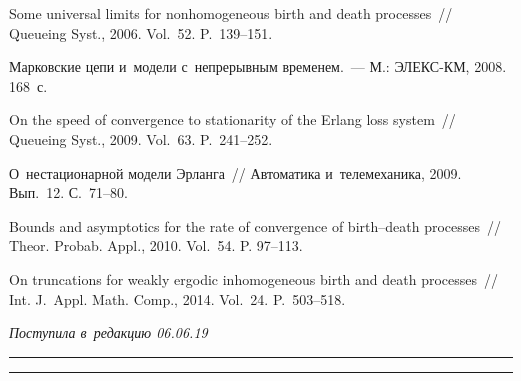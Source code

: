 \begin{multicols}{2}
{{\begin{thebibliography}{99}
Some universal limits for nonhomogeneous birth and death
processes~// Queueing Syst., 2006. Vol.~52. P.~139--151.

Марковские цепи и~модели с~непрерывным временем.~--- М.:  ЭЛЕКС-КМ, 2008. 168~с.

 On the speed of convergence to stationarity
of the Erlang loss system~// Queueing Syst.,  2009. Vol.~63. P.~241--252.

О~нестационарной модели Эрланга~// Автоматика и~телемеханика, 2009. Вып.~12. 
С.~71--80.

  Bounds and asymptotics
for the rate of convergence of birth--death processes~//  Theor. 
Probab. Appl., 2010. Vol.~54. P. 97--113.

  On truncations for weakly
ergodic inhomogeneous birth and death processes~// Int.
J.~Appl. Math. Comp., 2014. Vol.~24. P.~503--518.
 \end{thebibliography}

 }
 }

\end{multicols}

\vspace*{-6pt}

\hfill{\small\textit{Поступила в~редакцию 06.06.19}}

\vspace*{8pt}




\hrule

\vspace*{2pt}

\hrule


\def\tit{ON THE~BOUNDS OF~THE~RATE OF~CONVERGENCE FOR~SOME~QUEUEING MODELS 
WITH~INCOMPLETELY~DEFINED~INTENSITIES}


\def\titkol{On the~bounds of~the~rate of~convergence for~some queueing models 
with~incompletely defined intensities}

